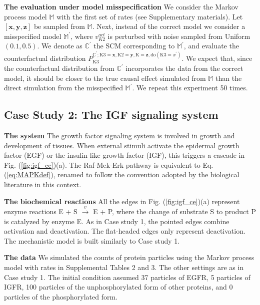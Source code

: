 \documentclass{article}
\def\eqref#1{Eq. (\ref{#1})}
\def\figref#1{Fig. (\ref{#1})}
\begin{document}
{\bf The evaluation under model misspecification} We consider the Markov process model $\mathbb{M}$ with the first set of rates (see Supplementary materials). Let $[\mathbf{x},\mathbf{y},\mathbf{z}]$ be sampled from $\mathbb{M}$.
Next, instead of the correct model we consider a misspecified model $\mathbb{M}^{\prime}$, where $v^{act}_{K2}$ is perturbed with noise sampled from Uniform$(0.1, 0.5)$.
We denote as $\mathbb{C}^{\prime}$  the SCM corresponding to $\mathbb{M}^{\prime}$, and evaluate the counterfactual distribution $P_{\text{K3}}^{\mathbb{C}^{\prime}; \text{K3}=\mathbf{x}, \text{K2}=\mathbf{y}, \text{K}=\mathbf{z}, \text{do}(\text{K3} = x^{\prime})}$. We expect that, since the counterfactual distribution from $\mathbb{C}^{\prime}$ incorporates the data from the correct model, it should be closer to the true causal effect simulated from $\mathbb{M}$ than the direct simulation from the misspecified $\mathbb{M}^{\prime}$. We repeat this experiment 50 times.


\subsection{Case Study 2: The IGF signaling system}

{\bf The system} The growth factor signaling system is involved in growth and development of tissues. When external stimuli activate the epidermal growth factor (EGF) or the insulin-like growth factor (IGF), this triggers a cascade \cite{BIANCONI2012142} in \figref{fig:igf_ce}(a). The Raf-Mek-Erk pathway is equivalent to \eqref{eq:MAPKdef},  renamed to follow the convention adopted by the biological literature in this context.

{\bf The biochemical reactions} All the edges in \figref{fig:igf_ce}(a) represent enzyme reactions E + S $\overset{v}{\rightarrow}$ E + P, where the change of substrate S to product P is catalyzed by enzyme E. As in Case study 1, the pointed edges combine activation and deactivation. The flat-headed edges only represent deactivation. The mechanistic model is built similarly to Case study 1.

{\bf The data} We simulated the counts of protein particles using the Markov process model with rates in Supplemental Tables 2 and 3. The other settings are as in Case study 1. The initial condition assumed 37 particles of EGFR, 5 particles of IGFR, 100 particles of the unphosphorylated form of other proteins, and 0 particles of the phosphorylated form.
\end{document}
